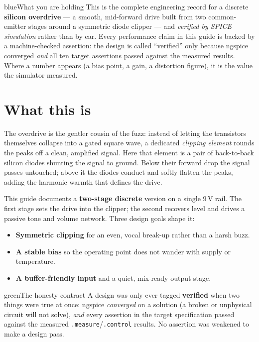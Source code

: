 \documentclass{schemaforge-report}
\begin{document}
\sfmaketitle

\begin{callout}{blue}{What you are holding}
This is the complete engineering record for a discrete \textbf{silicon overdrive} --- a smooth,
mid-forward drive built from two common-emitter stages around a symmetric diode clipper --- and
\emph{verified by SPICE simulation} rather than by ear. Every performance claim in this guide is
backed by a machine-checked assertion: the design is called ``verified'' only because ngspice
converged \emph{and} all ten target assertions passed against the measured results. Where a number
appears (a bias point, a gain, a distortion figure), it is the value the simulator measured.
\end{callout}

\section{What this is}
The overdrive is the gentler cousin of the fuzz: instead of letting the transistors themselves
collapse into a gated square wave, a dedicated \emph{clipping element} rounds the peaks off a clean,
amplified signal. Here that element is a pair of back-to-back silicon diodes shunting the signal to
ground. Below their forward drop the signal passes untouched; above it the diodes conduct and softly
flatten the peaks, adding the harmonic warmth that defines the drive.

This guide documents a \textbf{two-stage discrete} version on a single 9\,V rail. The first stage
sets the drive into the clipper; the second recovers level and drives a passive tone and volume
network. Three design goals shape it:
\begin{itemize}
  \item \textbf{Symmetric clipping} for an even, vocal break-up rather than a harsh buzz.
  \item \textbf{A stable bias} so the operating point does not wander with supply or temperature.
  \item \textbf{A buffer-friendly input} and a quiet, mix-ready output stage.
\end{itemize}

\begin{callout}{green}{The honesty contract}
A design was only ever tagged \textbf{verified} when two things were true at once: ngspice
\emph{converged} on a solution (a broken or unphysical circuit will not solve), \emph{and} every
assertion in the target specification passed against the measured \texttt{.measure}/\texttt{.control}
results. No assertion was weakened to make a design pass.
\end{callout}
\end{document}
